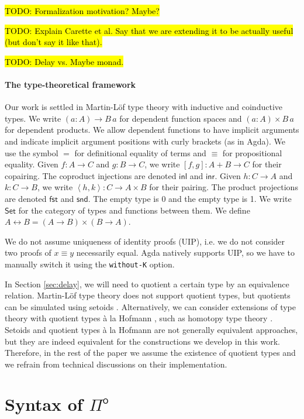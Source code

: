 \documentclass[runningheads]{llncs}
\newcommand{\Pio}{$\mathsf{\Pi}^{\mathsf{o}}$}
\newcommand{\Set}{\mathsf{Set}}
\newcommand{\U}{\mathcal{U}}
\newcommand{\copair}[2]{[#1,#2]}
\newcommand{\pair}[2]{\left< #1,#2 \right>}
\newcommand{\inl}{\mathsf{inl}}
\newcommand{\inr}{\mathsf{inr}}
\newcommand{\fst}{\mathsf{fst}}
\newcommand{\snd}{\mathsf{snd}}
\newcommand{\todo}[1]{\hl{TODO: #1}}
\begin{document}
\todo{Formalization motivation? Maybe?}

\todo{Explain Carette et al. Say that we are extending it to be actually useful (but don't say it like that).}

\todo{Delay vs. Maybe monad.}

\paragraph{The type-theoretical framework}

Our work is settled in Martin-L\"of type theory with inductive and
coinductive types. We write $(a : A) \to B \,a$ for dependent function
spaces and $(a : A) \times B \,a$ for dependent products. We allow
dependent functions to have implicit arguments and indicate implicit
argument positions with curly brackets (as in Agda). We use the
symbol $=$ for definitional equality of terms and $\equiv$ for
propositional equality. Given $f : A \to C$ and
$g : B \to C$, we write $\copair f g : A + B \to C$ for their
copairing. The coproduct injections are denoted $\inl$ and $\inr$.
Given $h : C \to A$ and $k : C \to B$, we write
$\pair h k : C \to A \times B$ for their pairing. The product
projections are denoted $\fst$ and $\snd$. The empty type is 0 and the
empty type is 1. We write $\Set$ for the category of
types and functions between them.
We define $A \leftrightarrow B = (A \to B) \times (B \to A)$.

We do not assume uniqueness of identity proofs
(UIP), i.e. we do not consider two proofs of $x \equiv y$ necessarily
equal. Agda natively supports UIP, so we have to manually switch it
using the \verb|without-K| option.

In Section \ref{sec:delay}, we will need to quotient a certain type by
an equivalence relation. Martin-L\"of type theory does not support
quotient types, but quotients can be simulated using setoids
\cite{BartheCP03}. Alternatively, we can consider extensions of type theory with
quotient types \`a la Hofmann \cite{Hofmann}, such as homotopy type
theory \cite{Hott}. Setoids and quotient types \`a la
Hofmann are not generally equivalent approaches, but they are indeed
equivalent for the constructions we develop in this work. Therefore,
in the rest of the paper we assume the existence of quotient types and
we refrain from technical discussions on their implementation.


\section{Syntax of \Pio}\label{sec:syntax}
\end{document}
